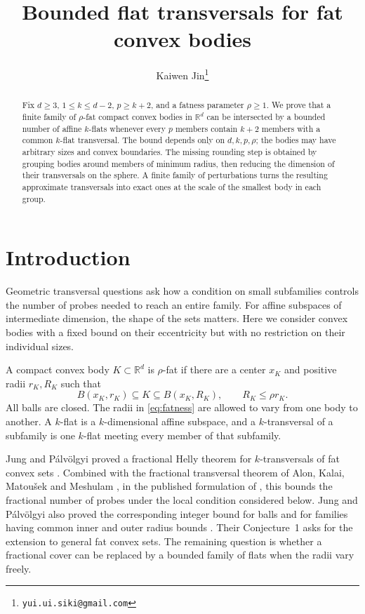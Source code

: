 \documentclass[11pt]{article}
\title{Bounded flat transversals for fat convex bodies}
\author{Kaiwen Jin\thanks{\texttt{yui.ui.siki@gmail.com}}}
\date{}
\theoremstyle{remark}
\newcommand{\R}{\mathbb R}
\begin{document}
\maketitle

\begin{abstract}
Fix \(d\geq3\), \(1\leq k\leq d-2\), \(p\geq k+2\), and a fatness
parameter \(\rho\geq1\). We prove that a finite family of \(\rho\)-fat
compact convex bodies in \(\R^d\) can be intersected by a bounded number
of affine \(k\)-flats whenever every \(p\) members contain \(k+2\) members
with a common \(k\)-flat transversal. The bound depends only on
\(d,k,p,\rho\); the bodies may have arbitrary sizes and convex boundaries.
The missing rounding step is obtained by grouping bodies around members
of minimum radius, then reducing the dimension of their transversals
on the sphere. A finite family of perturbations turns the resulting
approximate transversals into exact ones at the scale of the smallest
body in each group.
\end{abstract}

\section{Introduction}
\label{sec:introduction}

Geometric transversal questions ask how a condition on small subfamilies
controls the number of probes needed to reach an entire family.
For affine subspaces of intermediate dimension, the shape of the sets
matters. Here we consider convex bodies with a fixed bound on their
eccentricity but with no restriction on their individual sizes.

A compact convex body \(K\subset\R^d\) is \(\rho\)-fat if there are a
center \(x_K\) and positive radii \(r_K,R_K\) such that
\begin{equation}
 B(x_K,r_K)\subseteq K\subseteq B(x_K,R_K),
 \qquad R_K\leq\rho r_K.
 \label{eq:fatness}
\end{equation}
All balls are closed. The radii in \eqref{eq:fatness} are allowed to vary
from one body to another. A \(k\)-flat is a \(k\)-dimensional affine
subspace, and a \(k\)-transversal of a subfamily is one \(k\)-flat meeting
every member of that subfamily.

Jung and P\'alv\"olgyi proved a fractional Helly theorem for
\(k\)-transversals of fat convex sets \cite[Theorem~5]{JP}.
Combined with the fractional transversal theorem of Alon, Kalai,
Matou\v{s}ek and Meshulam \cite{AKMM}, in the published formulation of
\cite[Theorem~22]{JP}, this bounds the fractional number of probes under
the local condition considered below.
Jung and P\'alv\"olgyi also proved the corresponding integer bound for
balls and for families having common inner and outer radius bounds
\cite[Theorem~7 and Corollary~8]{JP}.
Their Conjecture~1 asks for the extension to general fat convex sets.
The remaining question is whether a fractional cover can be replaced by
a bounded family of flats when the radii vary freely.
\end{document}

